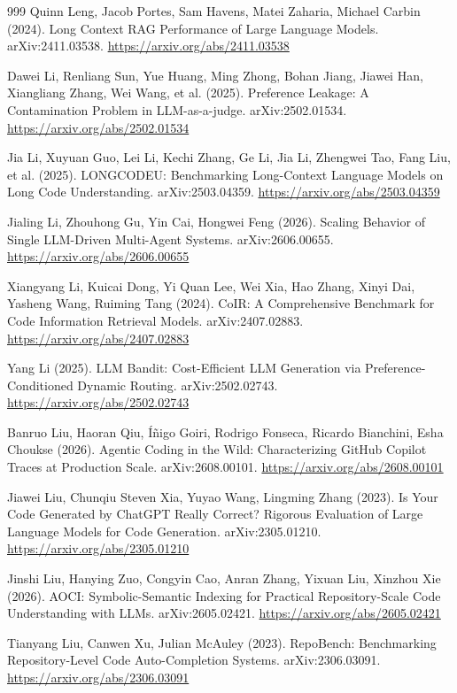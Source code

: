 \begin{thebibliography}{999}
 Quinn Leng, Jacob Portes, Sam Havens, Matei Zaharia, Michael Carbin (2024). Long Context RAG Performance of Large Language Models. arXiv:2411.03538. \url{https://arxiv.org/abs/2411.03538}

 Dawei Li, Renliang Sun, Yue Huang, Ming Zhong, Bohan Jiang, Jiawei Han, Xiangliang Zhang, Wei Wang, et al. (2025). Preference Leakage: A Contamination Problem in LLM-as-a-judge. arXiv:2502.01534. \url{https://arxiv.org/abs/2502.01534}

 Jia Li, Xuyuan Guo, Lei Li, Kechi Zhang, Ge Li, Jia Li, Zhengwei Tao, Fang Liu, et al. (2025). LONGCODEU: Benchmarking Long-Context Language Models on Long Code Understanding. arXiv:2503.04359. \url{https://arxiv.org/abs/2503.04359}

 Jialing Li, Zhouhong Gu, Yin Cai, Hongwei Feng (2026). Scaling Behavior of Single LLM-Driven Multi-Agent Systems. arXiv:2606.00655. \url{https://arxiv.org/abs/2606.00655}

 Xiangyang Li, Kuicai Dong, Yi Quan Lee, Wei Xia, Hao Zhang, Xinyi Dai, Yasheng Wang, Ruiming Tang (2024). CoIR: A Comprehensive Benchmark for Code Information Retrieval Models. arXiv:2407.02883. \url{https://arxiv.org/abs/2407.02883}

 Yang Li (2025). LLM Bandit: Cost-Efficient LLM Generation via Preference-Conditioned Dynamic Routing. arXiv:2502.02743. \url{https://arxiv.org/abs/2502.02743}

 Banruo Liu, Haoran Qiu, Íñigo Goiri, Rodrigo Fonseca, Ricardo Bianchini, Esha Choukse (2026). Agentic Coding in the Wild: Characterizing GitHub Copilot Traces at Production Scale. arXiv:2608.00101. \url{https://arxiv.org/abs/2608.00101}

 Jiawei Liu, Chunqiu Steven Xia, Yuyao Wang, Lingming Zhang (2023). Is Your Code Generated by ChatGPT Really Correct? Rigorous Evaluation of Large Language Models for Code Generation. arXiv:2305.01210. \url{https://arxiv.org/abs/2305.01210}

 Jinshi Liu, Hanying Zuo, Congyin Cao, Anran Zhang, Yixuan Liu, Xinzhou Xie (2026). AOCI: Symbolic-Semantic Indexing for Practical Repository-Scale Code Understanding with LLMs. arXiv:2605.02421. \url{https://arxiv.org/abs/2605.02421}

 Tianyang Liu, Canwen Xu, Julian McAuley (2023). RepoBench: Benchmarking Repository-Level Code Auto-Completion Systems. arXiv:2306.03091. \url{https://arxiv.org/abs/2306.03091}


\end{thebibliography}
